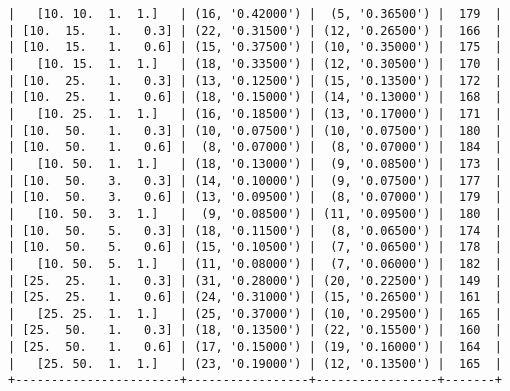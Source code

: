 \documentclass{article}
\begin{document}
\begin{verbatim}
|   [10. 10.  1.  1.]   | (16, '0.42000') |  (5, '0.36500') |  179  |
| [10.  15.   1.   0.3] | (22, '0.31500') | (12, '0.26500') |  166  |
| [10.  15.   1.   0.6] | (15, '0.37500') | (10, '0.35000') |  175  |
|   [10. 15.  1.  1.]   | (18, '0.33500') | (12, '0.30500') |  170  |
| [10.  25.   1.   0.3] | (13, '0.12500') | (15, '0.13500') |  172  |
| [10.  25.   1.   0.6] | (18, '0.15000') | (14, '0.13000') |  168  |
|   [10. 25.  1.  1.]   | (16, '0.18500') | (13, '0.17000') |  171  |
| [10.  50.   1.   0.3] | (10, '0.07500') | (10, '0.07500') |  180  |
| [10.  50.   1.   0.6] |  (8, '0.07000') |  (8, '0.07000') |  184  |
|   [10. 50.  1.  1.]   | (18, '0.13000') |  (9, '0.08500') |  173  |
| [10.  50.   3.   0.3] | (14, '0.10000') |  (9, '0.07500') |  177  |
| [10.  50.   3.   0.6] | (13, '0.09500') |  (8, '0.07000') |  179  |
|   [10. 50.  3.  1.]   |  (9, '0.08500') | (11, '0.09500') |  180  |
| [10.  50.   5.   0.3] | (18, '0.11500') |  (8, '0.06500') |  174  |
| [10.  50.   5.   0.6] | (15, '0.10500') |  (7, '0.06500') |  178  |
|   [10. 50.  5.  1.]   | (11, '0.08000') |  (7, '0.06000') |  182  |
| [25.  25.   1.   0.3] | (31, '0.28000') | (20, '0.22500') |  149  |
| [25.  25.   1.   0.6] | (24, '0.31000') | (15, '0.26500') |  161  |
|   [25. 25.  1.  1.]   | (25, '0.37000') | (10, '0.29500') |  165  |
| [25.  50.   1.   0.3] | (18, '0.13500') | (22, '0.15500') |  160  |
| [25.  50.   1.   0.6] | (17, '0.15000') | (19, '0.16000') |  164  |
|   [25. 50.  1.  1.]   | (23, '0.19000') | (12, '0.13500') |  165  |
+-----------------------+-----------------+-----------------+-------+
\end{verbatim}
\end{document}
